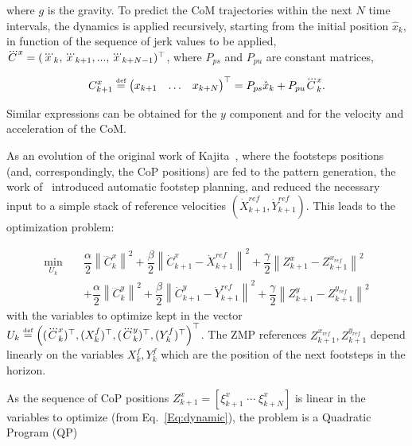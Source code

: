 where $g$ is the gravity. To predict the CoM trajectories within the next $N$ time intervals, the dynamics is applied recursively, starting from the initial position $\hat{x}_k$, in function of the sequence of jerk values to be applied, $\dddot{C}^{x} = (\dddot{x}_k, \dddot{x}_{k+1},...,\dddot{x}_{k+N-1})^{\top}$, where $P_{ps}$ and $P_{pu}$ are constant matrices,

\begin{equation}
 \label{Eq:PosCMHorizon}
 C^x_{k+1} \stackrel{\mbox{\tiny def}}{=} \left(
 \begin{matrix}
  x_{k+1} &
  \hdots &
  x_{k+N}
 \end{matrix}
 \right)^{\top} = P_{ps} \hat{x}_k + P_{pu} \dddot{C}^{x} _k.
\end{equation}

Similar expressions can be obtained for the $y$ component and for the velocity and acceleration of the CoM.

As an evolution of the original work of Kajita~\cite{Kajita2003}, where the footsteps positions (and, correspondingly, the CoP positions) are fed to the pattern generation, the work of~\cite{HerdtAR2010} introduced automatic footstep planning, and reduced the necessary input to a simple stack of reference velocities $(\dot{X}_{k+1}^{ref},\dot{Y}_{k+1}^{ref})$. This leads to the optimization problem:

{\scriptsize
\begin{eqnarray}
\nonumber
 \underset{U_{k}}{\min} \; && \dfrac{\alpha}{2} \left\| \dddot{C}_k^{x} \right\|^2 + \dfrac{\beta}{2} \left\| \dot{C}_{k+1}^{x} - \dot{X}_{k+1}^{ref} \right\|^2
 + \dfrac{\gamma}{2} \left\| Z_{k+1}^x - Z_{k+1}^{x_{ref}} \right\|^2 \\
 && + \dfrac{\alpha}{2} \left\| \dddot{C}_k^{y} \right\|^2 + \dfrac{\beta}{2} \left\| \dot{C}_{k+1}^{y} - \dot{Y}_{k+1}^{ref} \right\|^2
 + \dfrac{\gamma}{2} \left\| Z_{k+1}^y - Z_{k+1}^{y_{ref}} \right\|^2
\label{Eq:MinJerk}
\end{eqnarray}
}
with the variables to optimize kept in the vector $U_{k} \stackrel{\mbox{\tiny def}}{=}  \left( (\dddot{C}_k^{x})^ \top, (X_{k}^{f})^ \top, (\dddot{C}_k^{y})^ \top, (Y_{k}^{f})^ \top \right)^{\top}$. The ZMP references $Z_{k+1}^{x_{ref}},Z_{k+1}^{y_{ref}}$ depend linearly on the variables $X_{k}^{f},Y_{k}^{f}$ which are the position of the next footsteps in the horizon.

As the sequence of CoP positions $Z_{k+1}^x = [ {\xi}^x_{k+1} \; \cdots \; {\xi}^x_{k+N}]$ is linear in the variables to optimize (from Eq.~\ref{Eq:dynamic}), the problem is a Quadratic Program (QP) 

